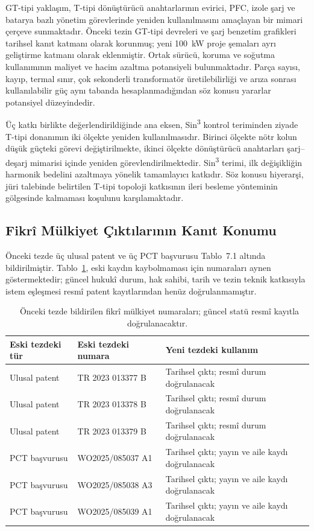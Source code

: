 GT-tipi yaklaşım, T-tipi dönüştürücü anahtarlarının evirici, PFC, izole şarj ve batarya bazlı yönetim görevlerinde yeniden kullanılmasını amaçlayan bir mimari çerçeve sunmaktadır. Önceki tezin GT-tipi devreleri ve şarj benzetim grafikleri tarihsel kanıt katmanı olarak korunmuş; yeni \SI{100}{\kilo\watt} proje şemaları ayrı geliştirme katmanı olarak eklenmiştir. Ortak sürücü, koruma ve soğutma kullanımının maliyet ve hacim azaltma potansiyeli bulunmaktadır. Parça sayısı, kayıp, termal sınır, çok sekonderli transformatör üretilebilirliği ve arıza sonrası kullanılabilir güç aynı tabanda hesaplanmadığından söz konusu yararlar potansiyel düzeyindedir.

Üç katkı birlikte değerlendirildiğinde ana eksen, Sin\textsuperscript{3} kontrol teriminden ziyade T-tipi donanımın iki ölçekte yeniden kullanılmasıdır. Birinci ölçekte nötr kolun düşük güçteki görevi değiştirilmekte, ikinci ölçekte dönüştürücü anahtarları şarj--deşarj mimarisi içinde yeniden görevlendirilmektedir. Sin\textsuperscript{3} terimi, ilk değişikliğin harmonik bedelini azaltmaya yönelik tamamlayıcı katkıdır. Söz konusu hiyerarşi, jüri talebinde belirtilen T-tipi topoloji katkısının ileri besleme yönteminin gölgesinde kalmaması koşulunu karşılamaktadır.

\subsection{Fikrî Mülkiyet Çıktılarının Kanıt Konumu}

Önceki tezde üç ulusal patent ve üç PCT başvurusu Tablo~7.1 altında bildirilmiştir. Tablo~\ref{tab:fikri-mulkiyet-tarihsel}, eski kaydın kaybolmaması için numaraları aynen göstermektedir; güncel hukukî durum, hak sahibi, tarih ve tezin teknik katkısıyla istem eşleşmesi resmî patent kayıtlarından henüz doğrulanmamıştır.

\begin{table}[htbp]
  \centering
  \caption{\eskitezetiketi\ Önceki tezde bildirilen fikrî mülkiyet numaraları; güncel statü resmî kayıtla doğrulanacaktır.}
  \label{tab:fikri-mulkiyet-tarihsel}
  \small
  \begin{tabularx}{\textwidth}{p{}p{}X}
    \toprule
    \textbf{Eski tezdeki tür} & \textbf{Eski tezdeki numara} & \textbf{Yeni tezdeki kullanım} \\
    \midrule
    Ulusal patent & TR 2023 013377 B & Tarihsel çıktı; resmî durum doğrulanacak \\
    Ulusal patent & TR 2023 013378 B & Tarihsel çıktı; resmî durum doğrulanacak \\
    Ulusal patent & TR 2023 013379 B & Tarihsel çıktı; resmî durum doğrulanacak \\
    PCT başvurusu & WO2025/085037 A1 & Tarihsel çıktı; yayın ve aile kaydı doğrulanacak \\
    PCT başvurusu & WO2025/085038 A3 & Tarihsel çıktı; yayın ve aile kaydı doğrulanacak \\
    PCT başvurusu & WO2025/085039 A1 & Tarihsel çıktı; yayın ve aile kaydı doğrulanacak \\
    \bottomrule
  \end{tabularx}
\end{table}

